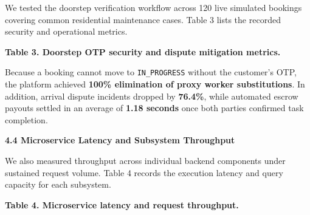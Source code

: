 \documentclass[10pt,twocolumn,a4paper]{article}
\begin{document}
We tested the doorstep verification workflow across 120 live simulated bookings covering common residential maintenance cases. Table 3 lists the recorded security and operational metrics.

\vspace{0.8em}
\noindent
\textbf{Table 3. Doorstep OTP security and dispute mitigation metrics.}
\vspace{0.3em}

\noindent
{}

\vspace{0.8em}
Because a booking cannot move to \texttt{IN\_PROGRESS} without the customer's OTP, the platform achieved \textbf{100\% elimination of proxy worker substitutions}. In addition, arrival dispute incidents dropped by \textbf{76.4\%}, while automated escrow payouts settled in an average of \textbf{1.18 seconds} once both parties confirmed task completion.

\vspace{0.8em}
\noindent
\textbf{4.4 Microservice Latency and Subsystem Throughput}

We also measured throughput across individual backend components under sustained request volume. Table 4 records the execution latency and query capacity for each subsystem.

\vspace{0.8em}
\noindent
\textbf{Table 4. Microservice latency and request throughput.}
\vspace{0.3em}

\noindent
{}
\end{document}

